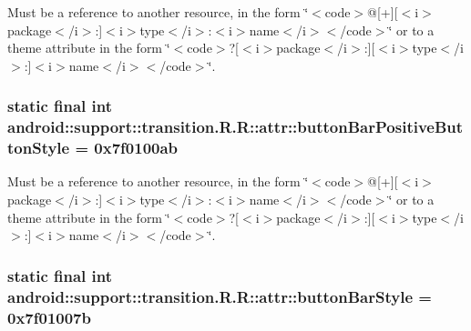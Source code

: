 Must be a reference to another resource, in the form \char`\"{}$<$code$>$@\mbox{[}+\mbox{]}\mbox{[}$<$i$>$package$<$/i$>$:\mbox{]}$<$i$>$type$<$/i$>$:$<$i$>$name$<$/i$>$$<$/code$>$\char`\"{} or to a theme attribute in the form \char`\"{}$<$code$>$?\mbox{[}$<$i$>$package$<$/i$>$:\mbox{]}\mbox{[}$<$i$>$type$<$/i$>$:\mbox{]}$<$i$>$name$<$/i$>$$<$/code$>$\char`\"{}. \hypertarget{classandroid_1_1support_1_1transition_1_1_r_1_1attr_7118de798c1808eb2ec30350c52c2cd8}{
\subsubsection[{buttonBarPositiveButtonStyle}]{\setlength{\rightskip}{0pt plus 5cm}static final int android::support::transition.R.R::attr::buttonBarPositiveButtonStyle = 0x7f0100ab}}
\label{classandroid_1_1support_1_1transition_1_1_r_1_1attr_7118de798c1808eb2ec30350c52c2cd8}


Must be a reference to another resource, in the form \char`\"{}$<$code$>$@\mbox{[}+\mbox{]}\mbox{[}$<$i$>$package$<$/i$>$:\mbox{]}$<$i$>$type$<$/i$>$:$<$i$>$name$<$/i$>$$<$/code$>$\char`\"{} or to a theme attribute in the form \char`\"{}$<$code$>$?\mbox{[}$<$i$>$package$<$/i$>$:\mbox{]}\mbox{[}$<$i$>$type$<$/i$>$:\mbox{]}$<$i$>$name$<$/i$>$$<$/code$>$\char`\"{}. \hypertarget{classandroid_1_1support_1_1transition_1_1_r_1_1attr_1757bbd30e765bf71c8529be67ca0fe1}{
\subsubsection[{buttonBarStyle}]{\setlength{\rightskip}{0pt plus 5cm}static final int android::support::transition.R.R::attr::buttonBarStyle = 0x7f01007b}}
\label{classandroid_1_1support_1_1transition_1_1_r_1_1attr_1757bbd30e765bf71c8529be67ca0fe1}


